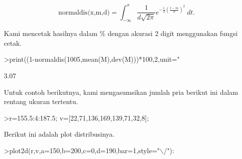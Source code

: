 \documentclass[a4paper,10pt]{article}
\begin{document}
\begin{eulernotebook}
\begin{eulercomment}
\begin{eulercomment}
\begin{eulercomment}
\begin{eulercomment}
\begin{eulercomment}
\begin{eulercomment}
\begin{eulercomment}
\begin{eulercomment}
\begin{eulercomment}
\begin{eulercomment}
\begin{eulercomment}
\begin{eulercomment}
\begin{eulercomment}
\begin{eulercomment}
\begin{eulercomment}
\begin{eulercomment}
\begin{eulercomment}
\begin{eulercomment}
\begin{eulercomment}
\begin{eulercomment}
\begin{eulercomment}
\begin{eulercomment}
\begin{eulercomment}
\begin{eulercomment}
\begin{eulercomment}
\begin{eulercomment}
\begin{eulercomment}
\begin{eulercomment}
\begin{eulercomment}
\begin{eulercomment}
\begin{eulercomment}
\begin{eulercomment}
\begin{eulercomment}
\begin{eulercomment}
\begin{eulercomment}
\begin{eulercomment}
\begin{eulercomment}
\begin{eulercomment}
\begin{eulercomment}
\begin{eulercomment}
\begin{eulercomment}
\begin{eulercomment}
\begin{eulercomment}
\begin{eulercomment}
\begin{eulercomment}
\end{eulercomment}
\begin{eulerformula}
\[
\text{normaldis(x,m,d)}=\int_{-\infty}^x \frac{1}{d\sqrt{2\pi}}e^{-\frac{1}{2}(\frac{t-m}{d})^2}\ dt.
\]
\end{eulerformula}
\begin{eulercomment}
Kami mencetak hasilnya dalam \% dengan akurasi 2 digit menggunakan
fungsi cetak.

\end{eulercomment}
\begin{eulerprompt}
>print((1-normaldis(1005,mean(M),dev(M)))*100,2,unit=" %
\end{eulerprompt}
\begin{euleroutput}
        3.07 %
\end{euleroutput}
\begin{eulercomment}
Untuk contoh berikutnya, kami mengasumsikan jumlah pria berikut ini
dalam rentang ukuran tertentu.
\end{eulercomment}
\begin{eulerprompt}
>r=155.5:4:187.5; v=[22,71,136,169,139,71,32,8];
\end{eulerprompt}
\begin{eulercomment}
Berikut ini adalah plot distribusinya.
\end{eulercomment}
\begin{eulerprompt}
>plot2d(r,v,a=150,b=200,c=0,d=190,bar=1,style="\(\backslash\)/"):
\end{eulerprompt}

\end{eulercomment}
\end{eulercomment}
\end{eulercomment}
\end{eulercomment}
\end{eulercomment}
\end{eulercomment}
\end{eulercomment}
\end{eulercomment}
\end{eulercomment}
\end{eulercomment}
\end{eulercomment}
\end{eulercomment}
\end{eulercomment}
\end{eulercomment}
\end{eulercomment}
\end{eulercomment}
\end{eulercomment}
\end{eulercomment}
\end{eulercomment}
\end{eulercomment}
\end{eulercomment}
\end{eulercomment}
\end{eulercomment}
\end{eulercomment}
\end{eulercomment}
\end{eulercomment}
\end{eulercomment}
\end{eulercomment}
\end{eulercomment}
\end{eulercomment}
\end{eulercomment}
\end{eulercomment}
\end{eulercomment}
\end{eulercomment}
\end{eulercomment}
\end{eulercomment}
\end{eulercomment}
\end{eulercomment}
\end{eulercomment}
\end{eulercomment}
\end{eulercomment}
\end{eulercomment}
\end{eulercomment}
\end{eulercomment}
\end{eulernotebook}
\end{document}
